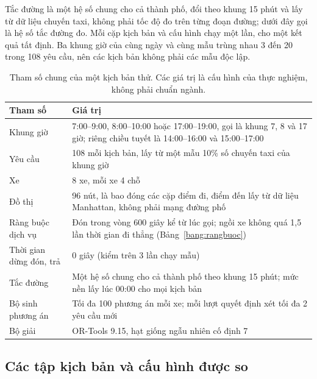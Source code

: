 Tắc đường là một hệ số chung cho cả thành phố, đổi theo khung 15 phút và lấy từ dữ liệu chuyến taxi,
không phải tốc độ đo trên từng đoạn đường; dưới đây gọi là hệ số tắc đường đo. Mỗi cặp kịch bản và cấu
hình chạy một lần, cho một kết quả tất định. Ba khung giờ của cùng ngày và cùng mẫu trùng nhau 3 đến 20
trong 108 yêu cầu, nên các kịch bản không phải các mẫu độc lập.

\begin{table}[htbp]
\centering
\caption{Tham số chung của một kịch bản thử. Các giá trị là cấu hình của thực nghiệm, không phải chuẩn
ngành.}
\label{bang:c4-thamso}
\small
\begin{tabular}{@{}p{4.0cm}p{11.0cm}@{}}
\toprule
\textbf{Tham số} & \textbf{Giá trị}\\
\midrule
Khung giờ & 7:00--9:00, 8:00--10:00 hoặc 17:00--19:00, gọi là khung 7, 8 và 17 giờ; riêng chiều tuyết
là 14:00--16:00 và 15:00--17:00\\
Yêu cầu & 108 mỗi kịch bản, lấy từ một mẫu 10\% số chuyến taxi của khung giờ\\
Xe & 8 xe, mỗi xe 4 chỗ\\
Đồ thị & 96 nút, là bao đóng các cặp điểm đi, điểm đến lấy từ dữ liệu Manhattan, không phải mạng đường
phố\\
Ràng buộc dịch vụ & Đón trong vòng 600 giây kể từ lúc gọi; ngồi xe không quá 1,5 lần thời gian đi
thẳng (Bảng~\ref{bang:rangbuoc})\\
Thời gian dừng đón, trả & 0 giây (kiểm trên 3 lần chạy mẫu)\\
Tắc đường & Một hệ số chung cho cả thành phố theo khung 15 phút; mức nền lấy lúc 00:00 cho mọi kịch
bản\\
Bộ sinh phương án & Tối đa 100 phương án mỗi xe; mỗi lượt quyết định xét tối đa 2 yêu cầu mới\\
Bộ giải & OR-Tools 9.15, hạt giống ngẫu nhiên cố định 7\\
\bottomrule
\end{tabular}
\end{table}

\subsection{Các tập kịch bản và cấu hình được so}
\label{muc:c4-taptu}

